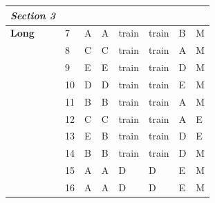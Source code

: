 \documentclass[pageno]{final_paper}
\newcommand{\textbi}[1]{\textbf{\textit{#1}}}
\begin{document}
\begin{table}[]
\begin{tabularx}{\textwidth}{lXXXXXXX}
\textbi{Section 3}       &                 &                         &                        &                         &                         &                         &                     \\ \midrule
\textbf{Long}            & 7               & A                       & A                      & train                   & train                   & B                       & M                   \\
\textbf{}                & 8               & C                       & C                      & train                   & train                   & A                       & M                   \\
\textbf{}                & 9               & E                       & E                      & train                   & train                   & D                       & M                   \\
\textbf{}                & 10              & D                       & D                      & train                   & train                   & E                       & M                   \\
\textbf{}                & 11              & B                       & B                      & train                   & train                   & A                       & M                   \\
\textbf{}                & 12              & C                       & C                      & train                   & train                   & A                       & E                   \\
\textbf{}                & 13              & E                       & B                      & train                   & train                   & D                       & E                   \\
\textbf{}                & 14              & B                       & B                      & train                   & train                   & D                       & M                   \\
\textbf{}                & 15              & A                       & A                      & D                       & D                       & E                       & M                   \\
\textbf{}                & 16              & A                       & A                      & D                       & D                       & E                       & M                   \\

\end{tabularx}
\end{table}
\end{document}
